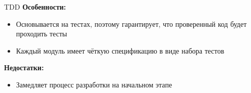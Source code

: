 \begin{frame}{TDD}
\textbf{Особенности:}
\begin{itemize}
    \item Основывается на тестах, поэтому гарантирует, что проверенный код будет проходить тесты
    \item Каждый модуль имеет чёткую спецификацию в виде набора тестов
\end{itemize}

\vspace{0.8cm}
\textbf{Недостатки:}
\begin{itemize}
    \item Замедляет процесс разработки на начальном этапе
\end{itemize}
\end{frame}